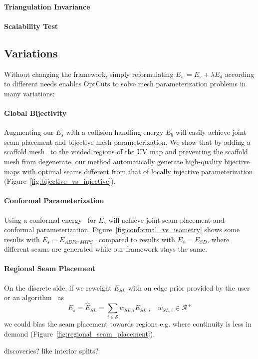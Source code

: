 \paragraph{Triangulation Invariance} 

\paragraph{Scalability Test} \minchen{[TODO]}

\subsection{Variations}

Without changing the framework, simply reformulating $E_w = E_s + \lambda E_d$ according to different needs enables OptCuts to solve mesh parameterization problems in many variations:

\paragraph{Global Bijectivity} \minchen{[DOING]} Augmenting our $E_s$ with a collision handling energy $E_b$ will easily achieve joint seam placement and bijective mesh parameterization. We show that by adding a scaffold mesh~\cite{Jiang2017Simplicial} to the voided regions of the UV map and preventing the scaffold mesh from degenerate, our method automatically generate high-quality bijective maps with optimal seams different from that of locally injective parameterization (Figure~\ref{fig:bijective_vs_injective}).

\paragraph{Conformal Parameterization} \minchen{[TODO]} Using a conformal energy~\cite{Hormann2000MIPS,Sheffer2005ABFPP} for $E_s$ will achieve joint seam placement and conformal parameterization. Figure~\ref{fig:conformal_vs_isometry} shows some results with $E_s = E_{ABForMIPS}$~\cite{} compared to results with $E_s = E_{SD}$, where different seams are generated while our framework stays the same.

\paragraph{Regional Seam Placement} \minchen{[TODO]} On the discrete side, if we reweight $E_{SL}$ with an edge prior provided by the user or an algorithm~\cite{} as
\[ E_s = \hat{E}_{SL} = \sum_{i\in\mathcal{S}} w_{SL,i} E_{SL,i} \quad w_{SL,i} \in \mathcal{R^+} \]
we could bias the seam placement towards regions e.g. where continuity is less in demand (Figure~\ref{fig:regional_seam_placement}).

discoveries? like interior splits?